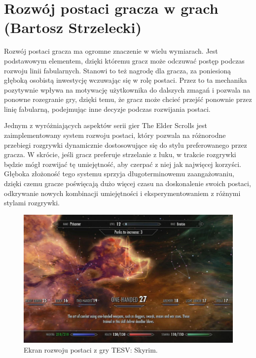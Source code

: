 \section{Rozwój postaci gracza w grach (Bartosz Strzelecki)}\label{s:wpr_progres}
Rozwój postaci gracza ma ogromne znaczenie w wielu wymiarach. Jest podstawowym elementem, dzięki któremu gracz może odczuwać postęp podczas rozwoju linii fabularnych. 
Stanowi to też nagrodę dla gracza, za poniesioną głęboką osobistą inwestycję wczuwając się w rolę postaci. Przez to ta mechanika pozytywnie
wpływa na motywację użytkownika do dalszych zmagań i pozwala na ponowne rozegranie gry, dzięki temu, że gracz może chcieć przejść
ponownie przez linię fabularną, podejmując inne decyzje podczas rozwijania postaci.

Jednym z wyróżniających aspektów serii gier The Elder Scrolls jest zaimplementowany system rozwoju postaci, który pozwala na różnorodne
przebiegi rozgrywki dynamicznie dostosowujące się do stylu preferowanego przez gracza. W skrócie, jeśli gracz preferuje strzelanie z łuku,
w trakcie rozgrywki będzie mógł rozwijać tę umiejętność, aby czerpać z niej jak najwięcej korzyści. Głęboka złożoność tego systemu sprzyja długoterminowemu zaangażowaniu,
dzięki czemu gracze poświęcają dużo więcej czasu na doskonalenie swoich postaci, odkrywanie nowych kombinacji umiejętności i eksperymentowaniem z różnymi
stylami rozgrywki.

\begin{figure}[h]
\centering
\includegraphics[width=1.0\textwidth]{images/tes.jpg}
\caption{Ekran rozwoju postaci z gry TESV: Skyrim.}
\end{figure}
